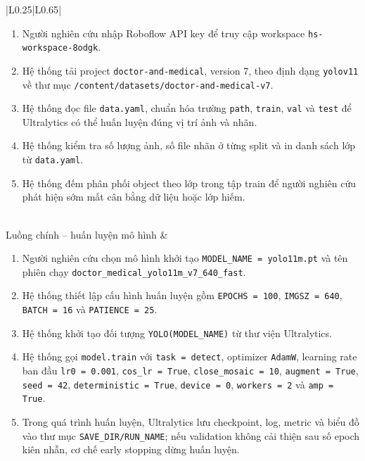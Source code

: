 \begin{longtable}{|L{0.25\textwidth}|L{0.65\textwidth}|}
\begin{minipage}[t]{\linewidth}
\begin{enumerate}[label=\textbf{Bước \arabic*:}, leftmargin=1.55cm, itemsep=0pt, topsep=0pt]
    \item Người nghiên cứu nhập Roboflow API key để truy cập workspace \texttt{hs-workspace-8odgk}.
    \item Hệ thống tải project \texttt{doctor-and-medical}, version 7, theo định dạng \texttt{yolov11} về thư mục \texttt{/content/datasets/doctor-and-medical-v7}.
    \item Hệ thống đọc file \texttt{data.yaml}, chuẩn hóa trường \texttt{path}, \texttt{train}, \texttt{val} và \texttt{test} để Ultralytics có thể huấn luyện đúng vị trí ảnh và nhãn.
    \item Hệ thống kiểm tra số lượng ảnh, số file nhãn ở từng split và in danh sách lớp từ \texttt{data.yaml}.
    \item Hệ thống đếm phân phối object theo lớp trong tập train để người nghiên cứu phát hiện sớm mất cân bằng dữ liệu hoặc lớp hiếm.
\end{enumerate}
\end{minipage} \\ \hline
Luồng chính -- huấn luyện mô hình &
\begin{minipage}[t]{\linewidth}
\begin{enumerate}[label=\textbf{Bước \arabic*:}, leftmargin=1.55cm, itemsep=0pt, topsep=0pt]
    \item Người nghiên cứu chọn mô hình khởi tạo \texttt{MODEL\_NAME = yolo11m.pt} và tên phiên chạy \texttt{doctor\_medical\_yolo11m\_v7\_640\_fast}.
    \item Hệ thống thiết lập cấu hình huấn luyện gồm \texttt{EPOCHS = 100}, \texttt{IMGSZ = 640}, \texttt{BATCH = 16} và \texttt{PATIENCE = 25}.
    \item Hệ thống khởi tạo đối tượng \texttt{YOLO(MODEL\_NAME)} từ thư viện Ultralytics.
    \item Hệ thống gọi \texttt{model.train} với \texttt{task = detect}, optimizer \texttt{AdamW}, learning rate ban đầu \texttt{lr0 = 0.001}, \texttt{cos\_lr = True}, \texttt{close\_mosaic = 10}, \texttt{augment = True}, \texttt{seed = 42}, \texttt{deterministic = True}, \texttt{device = 0}, \texttt{workers = 2} và \texttt{amp = True}.
    \item Trong quá trình huấn luyện, Ultralytics lưu checkpoint, log, metric và biểu đồ vào thư mục \texttt{SAVE\_DIR/RUN\_NAME}; nếu validation không cải thiện sau số epoch kiên nhẫn, cơ chế early stopping dừng huấn luyện.
\end{enumerate}
\end{minipage} \\ \hline

\end{longtable}
